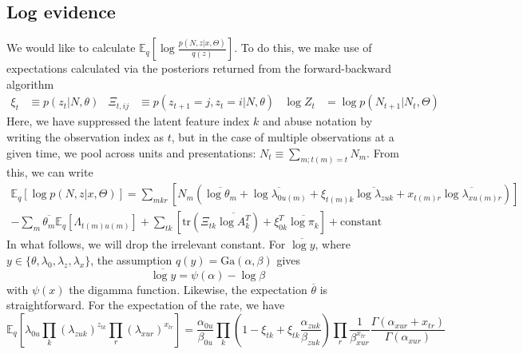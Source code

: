 \subsection{Log evidence}
\label{sec:log_evidence}
We would like to calculate $\mathbb{E}_{q}\left[ \log \frac{p(N, z|x, \Theta)}{q(z)}\right]$. To do this, we make use of expectations calculated via the posteriors returned from the forward-backward algorithm
\begin{align}
    \xi_{t} &\equiv p(z_{t}|N, \theta) &
    \Xi_{t, ij} &\equiv p(z_{t+1} = j, z_{t} = i|N, \theta) &
    \log Z_{t} &= \log p(N_{t+1}|N_{t}, \Theta)
\end{align}
Here, we have suppressed the latent feature index $k$ and abuse notation by writing the observation index as $t$, but in the case of multiple observations at a given time, we pool across units and presentations: $N_t \equiv \sum_{m; t(m) = t} N_m$. From this, we can write
\begin{multline}
    \label{eq:log_evidence}
     \mathbb{E}_{q}\left[ \log p(N, z|x, \Theta) \right] =
     \sum_{mkr} \left[N_m \left(
        \overline{\log \theta_m} + \overline{\log \lambda_{0u(m)}} +
        \xi_{t(m)k}\overline{\log \lambda_{zuk}} +
        x_{t(m)r} \overline{\log \lambda_{xu(m)r}}
     \right) \right] \\
     - \sum_m \overline{\theta_m} \mathbb{E}_q\left[\Lambda_{t(m)u(m)} \right]
      + \sum_{tk} \left[ \text{tr}\left(\Xi_{tk} \overline{\log A_k^T} \right)
     + \xi_{0k}^T \overline{\log \pi_k}
     \right]
    + \text{constant}
 \end{multline}
In what follows, we will drop the irrelevant constant. For $\overline{\log y}$, where $y \in \lbrace \theta, \lambda_0, \lambda_z, \lambda_x \rbrace$, the assumption $q(y) = \text{Ga}(\alpha, \beta)$ gives
\begin{equation}
    \overline{\log y} = \psi(\alpha) - \log \beta
\end{equation}
with $\psi(x)$ the digamma function. Likewise, the expectation $\overline{\theta}$ is straightforward. For the expectation of the rate, we have
\begin{equation}
    \label{eff_rate}
    \mathbb{E}_q\left[
        \lambda_{0u} \prod_k (\lambda_{zuk})^{z_{tk}} \prod_r (\lambda_{xur})^{x_{tr}}
    \right] = \frac{\alpha_{0u}}{\beta_{0u}}
    \prod_k \left(1 - \xi_{tk} + \xi_{tk} \frac{\alpha_{zuk}}{\beta_{zuk}} \right)
    \prod_r \frac{1}{\beta_{xur}^{x_{tr}}} \frac{\Gamma(\alpha_{xur} + x_{tr})}{\Gamma(\alpha_{xur})}
\end{equation}
